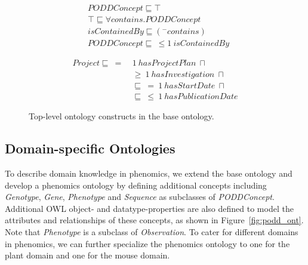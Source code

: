 \documentclass[preprint,12pt]{elsarticle}
\begin{document}
\vspace{-8pt}
\begin{figure}[htb]
\centering\small
\begin{minipage}[t]{.4\textwidth}
\begin{align*}
&PODDConcept \sqsubseteq \top\\
&\top \sqsubseteq \forall contains.PODDConcept\\
&isContainedBy \sqsubseteq (^-contains)\\
&PODDConcept \sqsubseteq~ \leq 1~ isContainedBy
\end{align*}
\end{minipage}
\begin{minipage}[t]{.4\textwidth}
\begin{align*}
Project \sqsubseteq~ =~ &1~ hasProjectPlan~\sqcap\\
        & \geq~ 1~ hasInvestigation~\sqcap\\
        &\sqsubseteq~ =~ 1~ hasStartDate~\sqcap\\
        &\sqsubseteq~ \leq~ 1~ hasPublicationDate
\end{align*}
\end{minipage}
\caption{Top-level ontology constructs in the base ontology.}\label{for:concept}
\end{figure}

\subsection{Domain-specific Ontologies}\label{sec:phe_ont}

To describe domain knowledge in phenomics, we extend the base ontology and develop a phenomics ontology by defining additional concepts including \emph{Genotype}, \emph{Gene}, \emph{Phenotype} and \emph{Sequence} as subclasses of \emph{PODDConcept}. Additional OWL object- and datatype-properties are also defined to model the attributes and relationships of these concepts, as shown in Figure~\ref{fig:podd_ont}. Note that \emph{Phenotype} is a subclass of \emph{Observation}. To cater for different domains in phenomics, we can further specialize the phenomics ontology to one for the plant domain and one for the mouse domain. 
\end{document}

